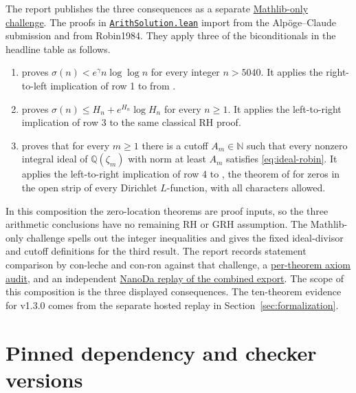 \documentclass[11pt]{amsart}
\theoremstyle{definition}
\theoremstyle{remark}
\numberwithin{equation}{section}
\begin{document}
The report publishes the three consequences as a separate
\href{https://math.mit.edu/~drew/grh/ArithChallenge.lean}{Mathlib-only challenge}.
The proofs in
\href{https://math.mit.edu/~drew/grh/ArithSolution.lean}{\texttt{ArithSolution.lean}}
import  from the Alp\"oge--Claude submission and
 from Robin1984. They apply three of the
biconditionals in the headline table as follows.
\begin{enumerate}[label=\textup{(\roman*)},itemsep=.3em]
\item {} proves
\(\sigma(n)<e^\gamma n\log\log n\) for every integer \(n>5040\).
It applies the right-to-left implication of row 1 to
 from .
\item {} proves
\(\sigma(n)\le H_n+e^{H_n}\log H_n\) for every \(n\ge1\).
It applies the left-to-right implication of row 3 to the same
classical RH proof.
\item {} proves that for every
\(m\ge1\) there is a cutoff \(A_m\in\mathbb N\) such that every
nonzero integral ideal of \(\mathbb Q(\zeta_m)\) with norm at
least \(A_m\) satisfies \eqref{eq:ideal-robin}. It applies the
left-to-right implication of row 4 to ,
the theorem of  for zeros in the open strip of
every Dirichlet \(L\)-function, with all characters allowed.
\end{enumerate}
In this composition the zero-location theorems are proof inputs,
so the three arithmetic conclusions have no remaining RH or GRH
assumption. The Mathlib-only challenge spells out the integer
inequalities and gives the fixed ideal-divisor and cutoff
definitions for the third result. The report records statement
comparison by con-leche and con-ron against that challenge,
a \href{https://math.mit.edu/~drew/grh/arith-audit.log}{per-theorem axiom audit},
and an independent
\href{https://math.mit.edu/~drew/grh/arith-nanoda.log}{NanoDa replay of the combined export}.
The scope of this composition is the three displayed consequences.
The ten-theorem evidence for v1.3.0 comes from the separate hosted
replay in Section~\ref{sec:formalization}.

\appendix

\section{Pinned dependency and checker versions}\label{app:dependency-pins}
\end{document}
